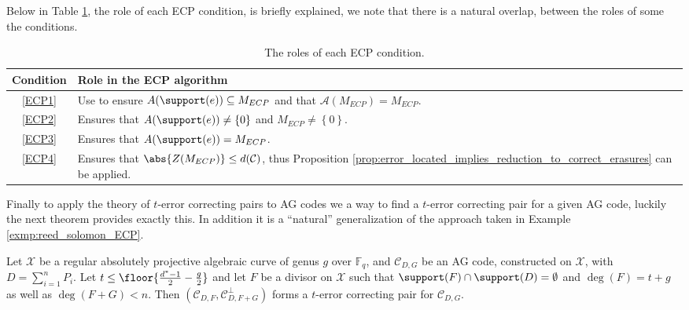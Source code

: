 Below in Table \ref{tab:role_of_ecp_conditions}, the role of each ECP condition, is briefly explained, we note that there is a natural overlap, between the roles of some the conditions.
\begin{table}[H]
    \centering
    \begin{tabular} {||c|l||}
        \hline
        \textbf{Condition} & \textbf{Role in the ECP algorithm} \\
        \hline
        \ref{ECP1} & Use to ensure $A(\support(e)) \subseteq M_{ECP}$ and that $\mathcal{A}(M_{ECP}) = M_{ECP}$. \\
        \hline
        \ref{ECP2} & Ensures that $A(\support(e)) \neq \left\{0\right\}$ and $M_{ECP} \neq \left\{0\right\}$.\\
        \hline
        \ref{ECP3} & Ensures that $A(\support(e)) = M_{ECP}$. \\
        \hline
        \ref{ECP4} & Ensures that $\abs{Z(M_{ECP})} \leq d(\mathcal{C})$, thus Proposition \ref{prop:error_located_implies_reduction_to_correct_erasures} can be applied.\\
        \hline
    \end{tabular}
    \caption{The roles of each ECP condition.}
    \label{tab:role_of_ecp_conditions}
\end{table}
Finally to apply the theory of $t$-error correcting pairs to AG codes we a way to find a $t$-error correcting pair for a given AG code, luckily the next theorem provides exactly this. In addition it is a ``natural'' generalization of the approach taken in Example \ref{exmp:reed_solomon_ECP}.
\begin{theorem}\label{thm:error_correcting_pair_for_AG_codes}
  Let $\mathcal{X}$ be a regular absolutely projective algebraic curve of genus $g$ over $\mathbb{F}_q$, and $\mathcal{C}_{D, G}$ be an AG code, constructed on $\mathcal{X}$, with $D = \sum_{i=1}^n P_i$. Let $t \leq \floor{\frac{d^{*} - 1}{2} - \frac{g}{2}}$ and let $F$ be a divisor on $\mathcal{X}$ such that $\support(F) \cap \support(D) = \emptyset$ and $\deg(F) = t + g$ as well as $\deg(F + G) < n$. Then $(\mathcal{C}_{D, F}, \mathcal{C}_{D, F + G}^{\perp})$ forms a $t$-error correcting pair for $\mathcal{C}_{D,G}$.
\end{theorem}

